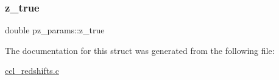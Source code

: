 \subsubsection{\texorpdfstring{z\+\_\+true}{z\_true}}
{\footnotesize\ttfamily double pz\+\_\+params\+::z\+\_\+true}



The documentation for this struct was generated from the following file\+:\begin{DoxyCompactItemize}
\item 
\mbox{\hyperlink{ccl__redshifts_8c}{ccl\+\_\+redshifts.\+c}}\end{DoxyCompactItemize}
